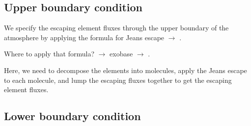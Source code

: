 \documentclass[11pt]{article}
\begin{document}
\subsection{Upper boundary condition}
\label{UpperBound}

We specify the escaping element fluxes through the upper boundary of
the atmosphere by applying the formula for Jeans escape $\to$ \citet{Tian2015}.

\noindent Where to apply that formula? $\to$ exobase $\to$ \citet{Volkov2011}.

\noindent Here, we need to decompose the elements into molecules,
apply the Jeans escape to each molecule, and lump the escaping fluxes
together to get the escaping element fluxes. 

\subsection{Lower boundary condition}
\label{LowerBound}
\end{document}
